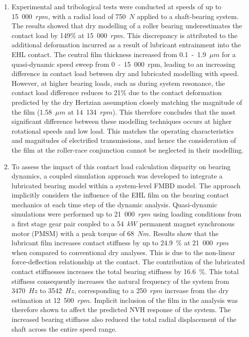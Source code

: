 \begin{enumerate}
	\item Experimental and tribological tests were conducted at speeds of up to 15~000~$rpm$, with a radial load of 750~$N$ applied to a shaft-bearing system. The results showed that dry modelling of a roller bearing underestimates the contact load by 149\% at 15~000~$rpm$. This discrepancy is attributed to the additional deformation incurred as a result of lubricant entrainment into the EHL contact. The central film thickness increased from 0.1~-~1.9~${\mu m}$ for a quasi-dynamic speed sweep from 0~-~15~000~rpm, leading to an increasing difference in contact load between dry and lubricated modelling with speed. However, at higher bearing loads, such as during system resonance, the contact load difference reduces to 21\% due to the contact deformation predicted by the dry Hertzian assumption closely matching the magnitude of the film (1.58~${\mu m}$ at 14~134~$rpm$). This therefore concludes that the most significant difference between these modelling techniques occurs at higher rotational speeds and low load. This matches the operating characteristics and magnitudes of electrified transmissions, and hence the consideration of the film at the roller-race conjunction cannot be neglected in their modelling.
		
	\item To assess the impact of this contact load calculation disparity on bearing dynamics, a coupled simulation approach was developed to integrate a lubricated bearing model within a system-level FMBD model. The approach implicitly considers the influence of the EHL film on the bearing contact mechanics at each time step of the dynamic analysis. Quasi-dynamic simulations were performed up to 21~000~$rpm$ using loading conditions from a first stage gear pair coupled to a 54~$kW$ permanent magnet synchronous motor (PMSM) with a peak torque of 68~$Nm$. Results show that the lubricant film increases contact stiffness by up to 24.9~\% at 21~000~$rpm$ when compared to conventional dry analyses. This is due to the non-linear force-deflection relationship at the contact. 
	The contribution of the lubricated contact stiffnesses increases the total bearing stiffness by 16.6~\%. This total stiffness consequently increases the natural frequency of the system from 3470~$Hz$ to 3542~$Hz$, corresponding to a 250~$rpm$ increase from the dry estimation at 12~500~$rpm$. Implicit inclusion of the film in the analysis was therefore shown to affect the predicted NVH response of the system. The increased bearing stiffness also reduced the total radial displacement of the shaft across the entire speed range.
	

\end{enumerate}
